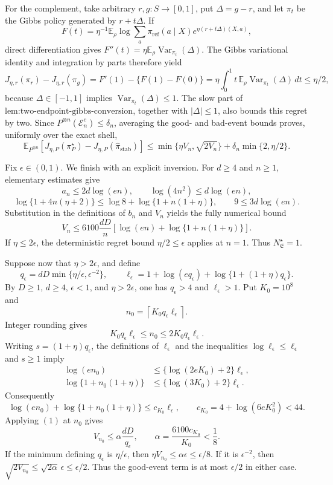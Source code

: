 For the complement, take arbitrary \(r,g:S\to[0,1]\), put \(\Delta=g-r\), and let \(\pi_t\) be the Gibbs policy generated by \(r+t\Delta\). If
\[
F(t)=\eta^{-1}\mathbb E_\rho\log\sum_a\pi_{\mathrm{ref}}(a\mid X)e^{\eta(r+t\Delta)(X,a)},
\]
direct differentiation gives \(F''(t)=\eta\mathbb E_\rho\operatorname{Var}_{\pi_t}(\Delta)\). The Gibbs variational identity and integration by parts therefore yield
\[
J_{\eta,r}(\pi_r)-J_{\eta,r}(\pi_g)
=F'(1)-\{F(1)-F(0)\}
=\eta\int_0^1t\,\mathbb E_\rho\operatorname{Var}_{\pi_t}(\Delta)\,dt
\le\eta/2,
\]
because \(\Delta\in[-1,1]\) implies \(\operatorname{Var}_{\pi_t}(\Delta)\le1\). The slow part of \(\text{lem:two-endpoint-gibbs-conversion}\), together with \(|\Delta|\le1\), also bounds this regret by two. Since \(P^{\otimes n}(\mathcal E_n^c)\le\delta_n\), averaging the good- and bad-event bounds proves, uniformly over the exact shell,
\[
\mathbb E_{P^{\otimes n}}\left[J_{\eta,P}(\pi_P^\star)-J_{\eta,P}(\widehat\pi_{\mathrm{stab}})\right]
\le\min\{\eta V_n,\sqrt{2V_n}\}
+\delta_n\min\{2,\eta/2\}.
\]

Fix \(\epsilon\in(0,1)\). We finish with an explicit inversion. For \(d\ge4\) and \(n\ge1\), elementary estimates give
\[
a_n\le2d\log(en),
\qquad
\log(4n^2)\le d\log(en),
\]
\[
\log\{1+4n(\eta+2)\}
\le\log8+\log\{1+n(1+\eta)\},
\qquad
9\le3d\log(en).
\]
Substitution in the definitions of \(b_n\) and \(V_n\) yields the fully numerical bound
\[
V_n
\le6100\frac{dD}{n}
\left[\log(en)+\log\{1+n(1+\eta)\}\right].
\tag{1}
\]
If \(\eta\le2\epsilon\), the deterministic regret bound \(\eta/2\le\epsilon\) applies at \(n=1\). Thus \(N^\star_{\mathfrak E}=1\).

Suppose now that \(\eta>2\epsilon\), and define
\[
q_\epsilon=dD\min\{\eta/\epsilon,\epsilon^{-2}\},
\qquad
\ell_\epsilon=1+\log(eq_\epsilon)+\log\{1+(1+\eta)q_\epsilon\}.
\]
By \(D\ge1\), \(d\ge4\), \(\epsilon<1\), and \(\eta>2\epsilon\), one has \(q_\epsilon>4\) and \(\ell_\epsilon>1\). Put \(K_0=10^8\) and
\[
n_0=\left\lceil K_0q_\epsilon\ell_\epsilon\right\rceil.
\]
Integer rounding gives
\[
K_0q_\epsilon\ell_\epsilon\le n_0\le2K_0q_\epsilon\ell_\epsilon.
\]
Writing \(s=(1+\eta)q_\epsilon\), the definitions of \(\ell_\epsilon\) and the inequalities \(\log\ell_\epsilon\le\ell_\epsilon\) and \(s\ge1\) imply
\[
\begin{aligned}
\log(en_0)
&\le\{\log(2eK_0)+2\}\ell_\epsilon,\\
\log\{1+n_0(1+\eta)\}
&\le\{\log(3K_0)+2\}\ell_\epsilon.
\end{aligned}
\]
Consequently
\[
\log(en_0)+\log\{1+n_0(1+\eta)\}
\le c_{K_0}\ell_\epsilon,
\qquad
c_{K_0}=4+\log(6eK_0^2)<44.
\]
Applying \((1)\) at \(n_0\) gives
\[
V_{n_0}\le\alpha\frac{dD}{q_\epsilon},
\qquad
\alpha=\frac{6100c_{K_0}}{K_0}<\frac18.
\]
If the minimum defining \(q_\epsilon\) is \(\eta/\epsilon\), then \(\eta V_{n_0}\le\alpha\epsilon\le\epsilon/8\). If it is \(\epsilon^{-2}\), then \(\sqrt{2V_{n_0}}\le\sqrt{2\alpha}\,\epsilon\le\epsilon/2\). Thus the good-event term is at most \(\epsilon/2\) in either case.

